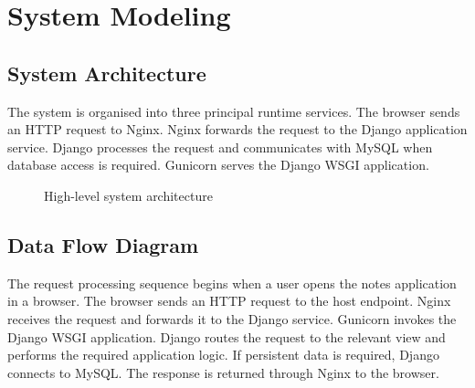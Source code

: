 \documentclass[12pt,a4paper,oneside]{report}
\begin{document}
\chapter{System Modeling}

\section{System Architecture}
The system is organised into three principal runtime services. The browser sends an HTTP request to Nginx. Nginx forwards the request to the Django application service. Django processes the request and communicates with MySQL when database access is required. Gunicorn serves the Django WSGI application.

\begin{figure}[H]
\centering
{}
\caption{High-level system architecture}
\label{fig:architecture}
\end{figure}

\section{Data Flow Diagram}
The request processing sequence begins when a user opens the notes application in a browser. The browser sends an HTTP request to the host endpoint. Nginx receives the request and forwards it to the Django service. Gunicorn invokes the Django WSGI application. Django routes the request to the relevant view and performs the required application logic. If persistent data is required, Django connects to MySQL. The response is returned through Nginx to the browser.
\end{document}
